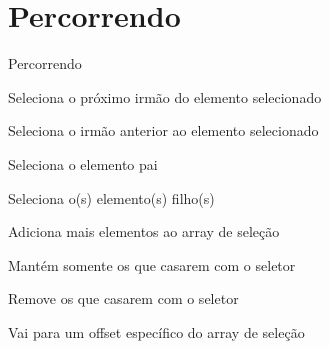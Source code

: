 \section{Percorrendo}
\begin{frame}{Percorrendo}
\begin{description}
	\pause\item[\$(...).next()] Seleciona o próximo irmão do elemento selecionado
	\pause\item[\$(...).prev()] Seleciona o irmão anterior ao elemento selecionado
	\pause\item[\$(...).parent()] Seleciona o elemento pai
	\pause\item[\$(...).children()] Seleciona o(s) elemento(s) filho(s)
	\pause\item[\$(...).add(...)] Adiciona mais elementos ao array de seleção
	\pause\item[\$(...).filter(...)] Mantém somente os que casarem com o seletor
	\pause\item[\$(...).not(...)] Remove os que casarem com o seletor
	\pause\item[\$(...).eq(...)] Vai para um offset específico do array de seleção
\end{description}
\end{frame}
